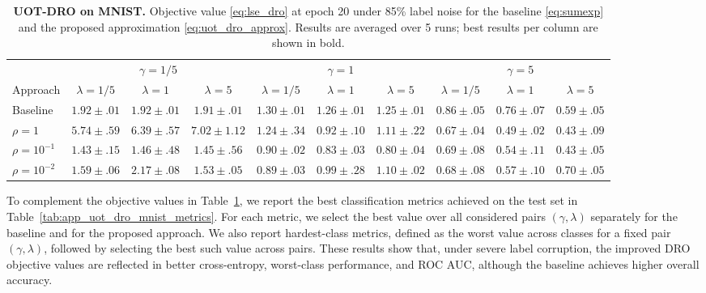\documentclass{article}
\theoremstyle{plain}
\theoremstyle{definition}
\theoremstyle{remark}
\begin{document}
\begin{table}
\centering
\small
\setlength{\tabcolsep}{3pt}
\caption{\textbf{UOT-DRO on MNIST.} Objective value \eqref{eq:lse_dro} at epoch 20 under 85\% label noise for the baseline \eqref{eq:sumexp} and the proposed approximation \eqref{eq:uot_dro_approx}. Results are averaged over 5 runs; best results per column are shown in bold.}
\label{tab:app_uot_dro_mnist}
\begin{tabular}{l|ccc|ccc|ccc}
\toprule
  & \multicolumn{3}{c|}{$\gamma=1/5$} & \multicolumn{3}{c|}{$\gamma=1$} & \multicolumn{3}{c}{$\gamma=5$} \\
\cline{2-4} \cline{5-7} \cline{8-10}
Approach & $\lambda=1/5$ & $\lambda=1$ & $\lambda=5$ & $\lambda=1/5$ & $\lambda=1$ & $\lambda=5$ & $\lambda=1/5$ & $\lambda=1$ & $\lambda=5$ \\
\midrule
Baseline & $1.92\!\pm\!.01$ & $\bm{1.92\!\pm\!.01}$ & $1.91\!\pm\!.01$ & $1.30\!\pm\!.01$ & $1.26\!\pm\!.01$ & $1.25\!\pm\!.01$ & $0.86\!\pm\!.05$ & $0.76\!\pm\!.07$ & $0.59\!\pm\!.05$ \\
\hline
$\rho\!=\!1$ & $5.74\!\pm\!.59$ & $6.39\!\pm\!.57$ & $7.02\!\pm\!1.12$ & $1.24\!\pm\!.34$ & $0.92\!\pm\!.10$ & $1.11\!\pm\!.22$ & $\bm{0.67\!\pm\!.04}$ & $\bm{0.49\!\pm\!.02}$ & $0.43\!\pm\!.09$ \\
\hline
$\rho\!=\!10^{-1}$ & $\bm{1.43\!\pm\!.15}$ & $\bm{1.46\!\pm\!.48}$ & $1.45\!\pm\!.56$ & $0.90\!\pm\!.02$ & $\bm{0.83\!\pm\!.03}$ & $\bm{0.80\!\pm\!.04}$ & $0.69\!\pm\!.08$ & $0.54\!\pm\!.11$ & $\bm{0.43\!\pm\!.05}$ \\
\hline
$\rho\!=\!10^{-2}$ & $1.59\!\pm\!.06$ & $2.17\!\pm\!.08$ & $\bm{1.53\!\pm\!.05}$ & $\bm{0.89\!\pm\!.03}$ & $0.99\!\pm\!.28$ & $1.10\!\pm\!.02$ & $0.68\!\pm\!.08$ & $0.57\!\pm\!.10$ & $0.70\!\pm\!.05$ \\
\bottomrule
\end{tabular}
\end{table}

To complement the objective values in Table~\ref{tab:app_uot_dro_mnist}, we report the best classification metrics achieved on the test set in Table~\ref{tab:app_uot_dro_mnist_metrics}. For each metric, we select the best value over all considered pairs $(\gamma,\lambda)$ separately for the baseline and for the proposed approach. We also report hardest-class metrics, defined as the worst value across classes for a fixed pair $(\gamma,\lambda)$, followed by selecting the best such value across pairs. These results show that, under severe label corruption, the improved DRO objective values are reflected in better cross-entropy, worst-class performance, and ROC AUC, although the baseline achieves higher overall accuracy. 
\end{document}
